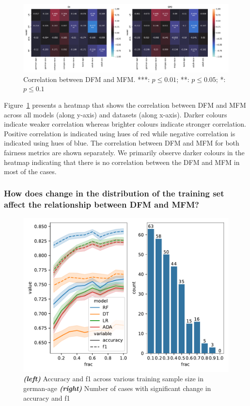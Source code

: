 \documentclass{article}
\begin{document}
\begin{figure}
  \centering
  \includegraphics[width=0.95\linewidth]{heatmap--corr--full-data.pdf}
  \caption{Correlation between DFM and MFM. ***: $p\le0.01$; **:
  $p\le0.05$; *: $p\le0.1$}
  \label{fig:heatmap--corr--full-data}
\end{figure}

Figure \ref{fig:heatmap--corr--full-data} presents a heatmap that
shows the correlation between DFM and MFM across all models (along
y-axis) and datasets (along x-axis). Darker colours indicate weaker
correlation whereas brighter colours indicate stronger
correlation. Positive correlation is indicated using hues of red while
negative correlation is indicated using hues of blue. The correlation
between DFM and MFM for both fairness metrics are shown separately. We
primarily observe darker colours in the heatmap indicating that there
is no correlation between the DFM and MFM in most of the cases.

\subsubsection{How does change in the distribution of the training set
  affect the relationship between DFM and MFM?}\label{sec:results-full-rel-dist}

\begin{figure}
  \centering
  \includegraphics[width=0.95\linewidth]{training-set-frac-threshold.pdf}
  \caption{\emph{\textbf{(left)}} Accuracy and f1 across various
    training sample size in german-age \emph{\textbf{(right)}} Number
    of cases with significant change in accuracy and f1}
  \label{fig:training-set-frac-threshold}
\end{figure}
\end{document}
